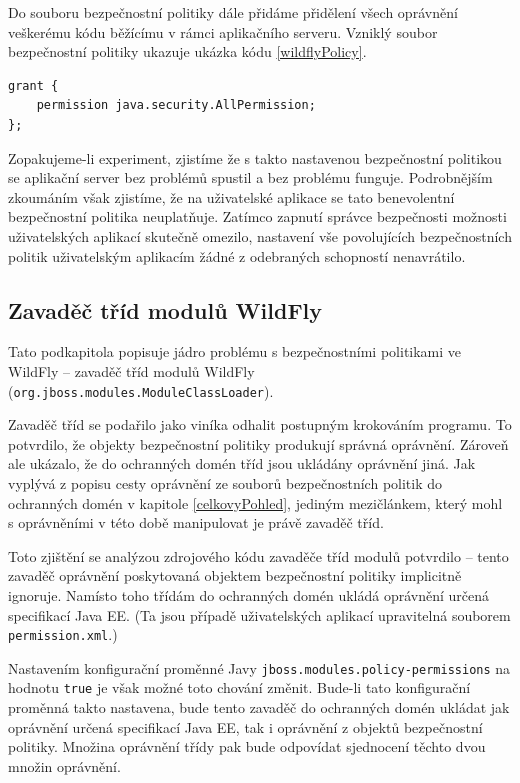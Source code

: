 Do souboru bezpečnostní politiky dále přidáme přidělení všech oprávnění veškerému kódu běžícímu v rámci aplikačního serveru. Vzniklý soubor bezpečnostní politiky ukazuje ukázka kódu \ref{wildflyPolicy}.

\begin{lstlisting}[caption=První testovací soubor bezpečnostní politiky, label=wildflyPolicy]
grant {
    permission java.security.AllPermission;
};
\end{lstlisting}

Zopakujeme-li experiment, zjistíme že s takto nastavenou bezpečnostní politikou se aplikační server bez problémů spustil a bez problému funguje.
Podrobnějším zkoumáním však zjistíme, že na uživatelské aplikace se tato benevolentní bezpečnostní politika neuplatňuje.
Zatímco zapnutí správce bezpečnosti možnosti uživatelských aplikací skutečně omezilo, nastavení vše povolujících bezpečnostních politik uživatelským
aplikacím žádné z odebraných schopností nenavrátilo.

\subsection{Zavaděč tříd modulů WildFly} \label{moduleClassLoader}

Tato podkapitola popisuje jádro problému s bezpečnostními politikami ve WildFly -- zavaděč tříd modulů WildFly ({\tt org.jboss.modules.ModuleClassLoader}).

Zavaděč tříd se podařilo jako viníka odhalit postupným krokováním programu.
To potvrdilo, že objekty bezpečnostní politiky produkují správná oprávnění.
Zároveň ale ukázalo, že do ochranných domén tříd jsou ukládány oprávnění jiná.
Jak vyplývá z popisu cesty oprávnění ze souborů bezpečnostních politik do ochranných domén v kapitole \ref{celkovyPohled},
jediným mezičlánkem, který mohl s oprávněními v této době manipulovat je právě zavaděč tříd.

Toto zjištění se analýzou zdrojového kódu zavaděče tříd modulů potvrdilo -- tento zavaděč oprávnění poskytovaná objektem bezpečnostní politiky implicitně ignoruje.
Namísto toho třídám do ochranných domén ukládá oprávnění určená specifikací Java EE. \cite{javaEEspec}
(Ta jsou případě uživatelských aplikací upravitelná souborem {\tt permission.xml}.)

Nastavením konfigurační proměnné Javy {\tt jboss.modules.policy-permissions} na hodnotu {\tt true} je však možné toto chování změnit.
Bude-li tato konfigurační proměnná takto nastavena, bude tento zavaděč do ochranných domén ukládat jak oprávnění určená specifikací Java EE, tak i oprávnění z objektů bezpečnostní politiky.
Množina oprávnění třídy pak bude odpovídat sjednocení těchto dvou množin oprávnění.
\cite{sourceModuleClassLoader}

